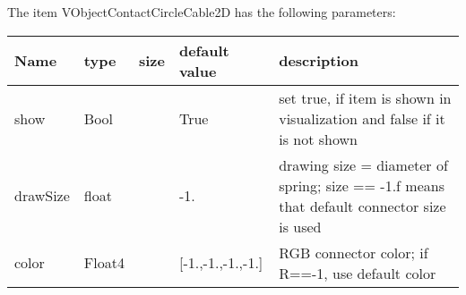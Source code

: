 The item VObjectContactCircleCable2D has the following parameters:
\begin{center}
  \footnotesize
  \begin{longtable}{| p{4.5cm} | p{2.5cm} | p{0.5cm} | p{2.5cm} | p{6cm} |}
    \hline
    \bf Name & \bf type & \bf size & \bf default value & \bf description \\ \hline
    show &     Bool &      &     True &     set true, if item is shown in visualization and false if it is not shown\\ \hline
    drawSize &     float &      &     -1. &     drawing size = diameter of spring; size == -1.f means that default connector size is used\\ \hline
    color &     Float4 &      &     [-1.,-1.,-1.,-1.] &     RGB connector color; if R==-1, use default color\\ \hline
	  \end{longtable}
	\end{center}


